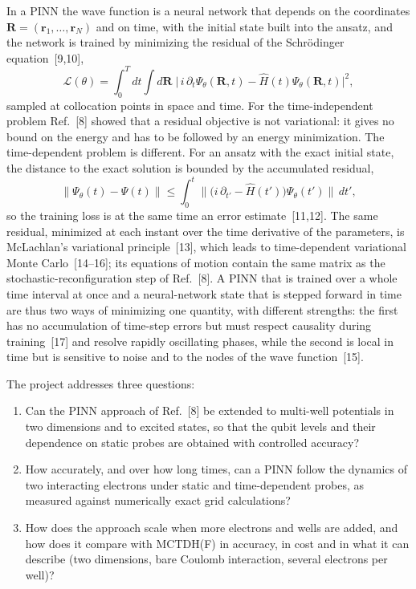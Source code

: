 \documentclass[12pt,a4paper]{article}
\begin{document}
In a PINN the wave function is a neural network that depends on the
coordinates $\boldsymbol R=(\boldsymbol r_1,\dots,\boldsymbol r_N)$ and
on time, with the initial state built into the ansatz, and the
network is trained by minimizing the residual of the Schr\"odinger
equation~[9,10],
\[
  \mathcal L(\theta)=\int_0^T\!dt\int\! d\boldsymbol R\;
  \bigl|\,i\,\partial_t\Psi_\theta(\boldsymbol R,t)
  -\hat H(t)\Psi_\theta(\boldsymbol R,t)\bigr|^2 ,
\]
sampled at collocation points in space and time.  For the
time-independent problem Ref.~[8] showed that a residual objective is
not variational: it gives no bound on the energy and has to be
followed by an energy minimization.  The time-dependent problem is
different.  For an ansatz with the exact initial state, the distance
to the exact solution is bounded by the accumulated residual,
\[
  \bigl\|\Psi_\theta(t)-\Psi(t)\bigr\|\le\int_0^t
  \bigl\|\bigl(i\,\partial_{t'}-\hat H(t')\bigr)\Psi_\theta(t')\bigr\|\,dt' ,
\]
so the training loss is at the same time an error
estimate~[11,12].  The same residual, minimized at each instant over
the time derivative of the parameters, is McLachlan's variational
principle~[13], which leads to time-dependent variational Monte
Carlo~[14--16]; its equations of motion contain the same matrix as the
stochastic-reconfiguration step of Ref.~[8].  A PINN that is trained
over a whole time interval at once and a neural-network state that is
stepped forward in time are thus two ways of minimizing one quantity,
with different strengths: the first has no accumulation of time-step
errors but must respect causality during training~[17] and resolve
rapidly oscillating phases, while the second is local in time but is
sensitive to noise and to the nodes of the wave function~[15].

The project addresses three questions:
\begin{enumerate}
  \item Can the PINN approach of Ref.~[8] be extended to multi-well
  potentials in two dimensions and to excited states, so that the
  qubit levels and their dependence on static probes are obtained
  with controlled accuracy?
  \item How accurately, and over how long times, can a PINN follow the
  dynamics of two interacting electrons under static and
  time-dependent probes, as measured against numerically exact grid
  calculations?
  \item How does the approach scale when more electrons and wells are
  added, and how does it compare with MCTDH(F) in accuracy, in cost
  and in what it can describe (two dimensions, bare Coulomb
  interaction, several electrons per well)?
\end{enumerate}
\end{document}
